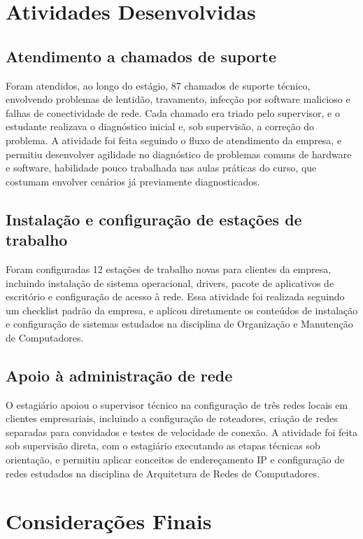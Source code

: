\documentclass[article,12pt,a4paper,oneside]{abntex2}
\begin{document}
\section{Atividades Desenvolvidas}

\subsection{Atendimento a chamados de suporte}

Foram atendidos, ao longo do estágio, 87 chamados de suporte técnico,
envolvendo problemas de lentidão, travamento, infecção por software
malicioso e falhas de conectividade de rede. Cada chamado era triado pelo
supervisor, e o estudante realizava o diagnóstico inicial e, sob
supervisão, a correção do problema. A atividade foi feita seguindo o
fluxo de atendimento da empresa, e permitiu desenvolver agilidade no
diagnóstico de problemas comuns de hardware e software, habilidade pouco
trabalhada nas aulas práticas do curso, que costumam envolver cenários já
previamente diagnosticados.

\subsection{Instalação e configuração de estações de trabalho}

Foram configuradas 12 estações de trabalho novas para clientes da empresa,
incluindo instalação de sistema operacional, drivers, pacote de
aplicativos de escritório e configuração de acesso à rede. Essa atividade
foi realizada seguindo um checklist padrão da empresa, e aplicou
diretamente os conteúdos de instalação e configuração de sistemas
estudados na disciplina de Organização e Manutenção de Computadores.

\subsection{Apoio à administração de rede}

O estagiário apoiou o supervisor técnico na configuração de três redes
locais em clientes empresariais, incluindo a configuração de roteadores,
criação de redes separadas para convidados e testes de velocidade de
conexão. A atividade foi feita sob supervisão direta, com o estagiário
executando as etapas técnicas sob orientação, e permitiu aplicar
conceitos de endereçamento IP e configuração de redes estudados na
disciplina de Arquitetura de Redes de Computadores.

\section{Considerações Finais}
\end{document}

